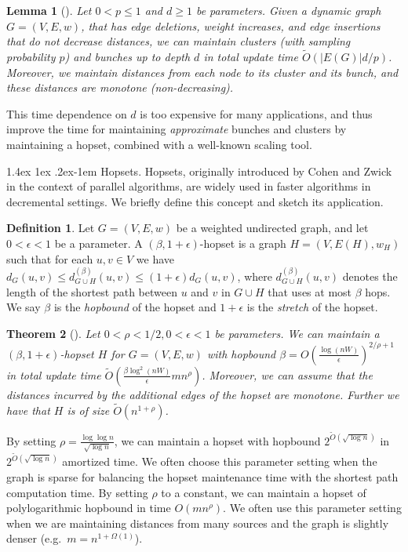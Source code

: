 \documentclass[11pt]{article}
\makeatletter
\newtheorem{theorem}{Theorem}[section]
\newtheorem{lemma}[theorem]{Lemma}
\theoremstyle{definition}
\newtheorem{definition}{Definition}
\theoremstyle{remark}
\renewcommand{\paragraph}{%
  \@startsection{paragraph}{4}%
  {\z@}{1.4ex \@plus 1ex \@minus .2ex}{-1em}%
  {\normalfont\normalsize\bfseries}%
}
\makeatother
\begin{document}
\begin{lemma}[\cite{RZ12}]\label{lem:rz}
Let $0<p\leq 1$ and $d\geq 1$ be parameters. Given a dynamic graph $G=(V,E,w)$, that has edge deletions, weight increases, and edge insertions that do not decrease distances, we can maintain clusters (with sampling probability $p$) and bunches up to depth $d$ in total update time $\tilde O(|E(G)|d/p)$. Moreover, we maintain distances from each node to its cluster and its bunch, and these distances are monotone (non-decreasing).
\end{lemma}

This time dependence on $d$ is too expensive for many applications, and thus \cite{LN2020} improve the time for maintaining \textit{approximate} bunches and clusters by maintaining a hopset, combined with a well-known scaling tool. 

\paragraph{Hopsets.}
Hopsets, originally introduced by Cohen and Zwick~\cite{CohenZ01} in the context of parallel algorithms, are widely used in faster algorithms in decremental settings. We briefly define this concept and sketch its application. 
\begin{definition}
Let $G=(V,E,w)$ be a weighted undirected graph, and let $0<\epsilon <1$ be a parameter. A $(\beta,1+\epsilon)$-hopset is a graph $H=(V,E(H),w_H)$ such that for each $u,v\in V$ we have $d_G(u,v)\leq d^{(\beta)}_{G\cup H}(u,v) \leq (1+\epsilon) d_G(u,v)$, where $d^{(\beta)}_{G\cup H}(u,v)$ denotes the length of the shortest path between $u$ and $v$ in $G\cup H$ that uses at most $\beta$ hops. We say $\beta$ is the \emph{hopbound} of the hopset and $1+\epsilon$ is the \emph{stretch} of the hopset. 
\end{definition}


\begin{theorem}[\cite{LN2020}] \label{thm:hopset}
Let $0 < \rho < 1/2, 0< \epsilon <1$ be parameters. We can maintain a $(\beta,1+\epsilon)$-hopset $H$ for $G=(V,E,w)$ with hopbound $\beta =  O(\tfrac{\log(nW)}{\epsilon})^{2/\rho+1}$ in total update time $\tilde O (\tfrac{\beta\log^2(nW)}{\epsilon}mn^{\rho})$. Moreover, we can assume that the distances incurred by the additional edges of the hopset are monotone. Further we have that $H$ is of size $\tilde O(n^{1+\rho})$. 
\end{theorem}

By setting $\rho=\frac{\log \log n}{\sqrt{\log n}}$, we can maintain a hopset with hopbound $2^{\tilde{O}(\sqrt{\log n})}$ in $2^{\tilde{O}(\sqrt{\log n})}$ amortized time. We often choose this parameter setting when the graph is sparse for balancing the hopset maintenance time with the shortest path computation time.
By setting $\rho$ to a constant, we can maintain a hopset of polylogarithmic hopbound in time $O(mn^{\rho})$. We often use this parameter setting when we are maintaining distances from many sources and the graph is slightly denser (e.g.~$m=n^{1+\Omega(1)}$).
\end{document}

